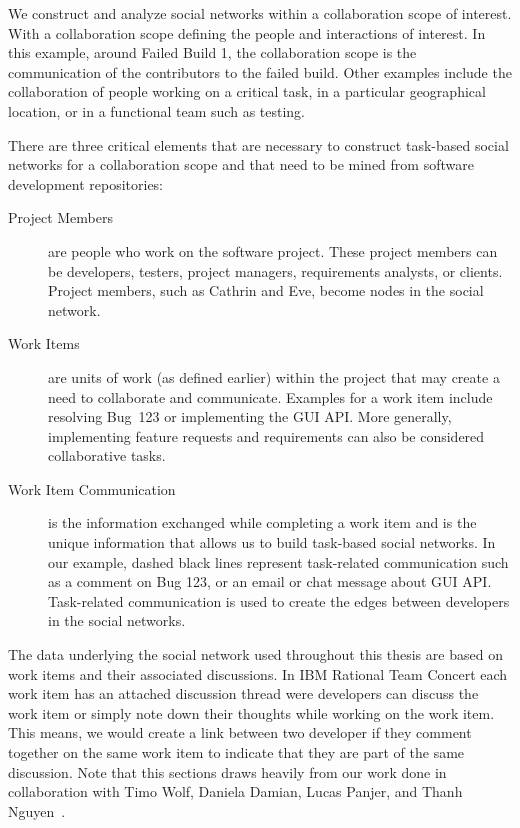 We construct and analyze social networks within a collaboration scope of interest.
With a collaboration scope defining the people and interactions of interest.
In this example, around Failed Build 1, the collaboration scope is the communication of the contributors to the failed build. 
Other examples include the collaboration of people working on a critical task, in a particular geographical location, or in a functional team such as testing.

There are three critical elements that are necessary to construct task-based social networks for a collaboration scope and that need to be mined from software development repositories:

\begin{description}
\item[Project Members] are people who work on the software project. 
These project members can be developers, testers, project managers, requirements analysts,
or clients. 
Project members, such as Cathrin and Eve, become nodes in the social network.

\item[Work Items] are units of work (as defined earlier) within the project that may create a need to collaborate and communicate. 
Examples for a work item include resolving Bug~123 or implementing the GUI API. 
More generally, implementing feature requests and requirements can also be considered collaborative tasks.

\item[Work Item Communication] is the information exchanged while completing a work item and is the unique information that allows us to build task-based social networks. 
In our example, dashed black lines represent task-related communication such as a comment on Bug 123, or an email or chat message about GUI API.
Task-related communication is used to create the edges between developers in the social networks.
\end{description}

The data underlying the social network used throughout this thesis are based on work items and their associated discussions.
In IBM Rational Team Concert each work item has an attached discussion thread were developers can discuss the work item or simply note down their thoughts while working on the work item.
This means, we would create a link between two developer if they comment together on the same work item to indicate that they are part of the same discussion.
Note that this sections draws heavily from our work done in collaboration with Timo Wolf, Daniela Damian, Lucas Panjer, and Thanh Nguyen~\cite{wolf:ieee:2009}.

